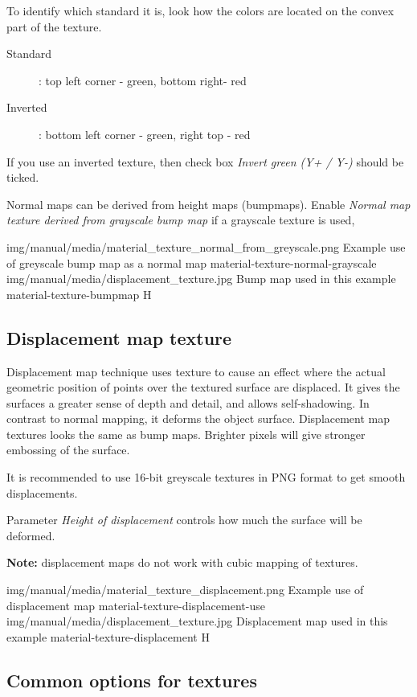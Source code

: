 To identify which standard it is, look how the colors are located on the convex part of the texture.
\begin{description}
\item[Standard]: top left corner - green, bottom right- red
\item[Inverted]: bottom left corner - green, right top - red
\end{description}
If you use an inverted texture, then check box  \emph{Invert green (Y+ / Y-)}  should be ticked.

Normal maps can be derived from height maps (bumpmaps). Enable \emph{Normal map texture derived from grayscale bump map} if a grayscale texture is used,

\twoImagesWithTwoCaptionsFullWidth
{img/manual/media/material_texture_normal_from_greyscale.png}
{Example use of greyscale bump map as a normal map}
{material-texture-normal-grayscale}
{img/manual/media/displacement_texture.jpg}
{Bump map used in this example}
{material-texture-bumpmap}
{H}

\subsection{Displacement map texture}\label{materials-texture-displacement}

Displacement map technique uses texture to cause an effect where the actual geometric position of points over the textured surface are displaced. It gives the surfaces a greater sense of depth and detail, and allows self-shadowing. In contrast to normal mapping, it deforms the object surface.
Displacement map textures looks the same as bump maps. Brighter pixels will give stronger embossing of the surface.

It is recommended to use 16-bit greyscale textures in PNG format to get smooth displacements.

Parameter \emph{Height of displacement} controls how much the surface will be deformed.

\textbf{Note:} displacement maps do not work with cubic mapping of textures.

\twoImagesWithTwoCaptionsFullWidth
{img/manual/media/material_texture_displacement.png}
{Example use of displacement map}
{material-texture-displacement-use}
{img/manual/media/displacement_texture.jpg}
{Displacement map used in this example}
{material-texture-displacement}
{H}

\subsection{Common options for textures}\label{materials-textures}


